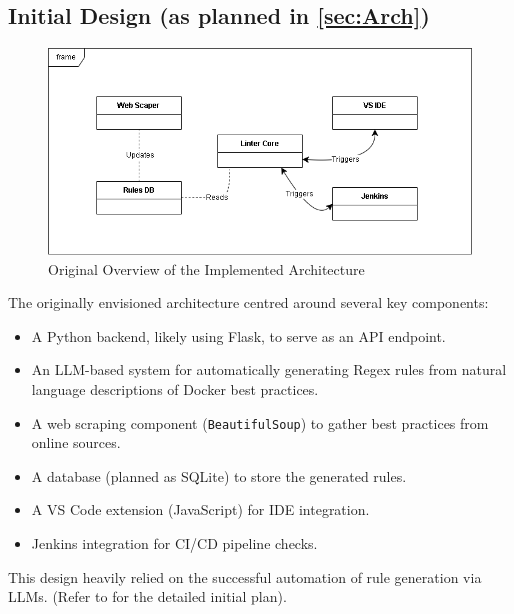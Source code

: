 \subsection{Initial Design (as planned in \ref{sec:Arch})}
\begin{figure}[h!]
    \centering
    \includegraphics[width=1\linewidth]{Figures/UML.png} %
    \caption{Original Overview of the Implemented Architecture}
    \label{fig:original_architecture} %
\end{figure}
The originally envisioned architecture centred around several key components:
\begin{itemize}
    \item A Python backend, likely using Flask, to serve as an API endpoint.
    \item An LLM-based system for automatically generating Regex rules from natural language descriptions of Docker best practices.
    \item A web scraping component (\texttt{BeautifulSoup}) to gather best practices from online sources.
    \item A database (planned as SQLite) to store the generated rules.
    \item A VS Code extension (JavaScript) for IDE integration.
    \item Jenkins integration for CI/CD pipeline checks.
\end{itemize}
This design heavily relied on the successful automation of rule generation via LLMs. (Refer to  for the detailed initial plan).

